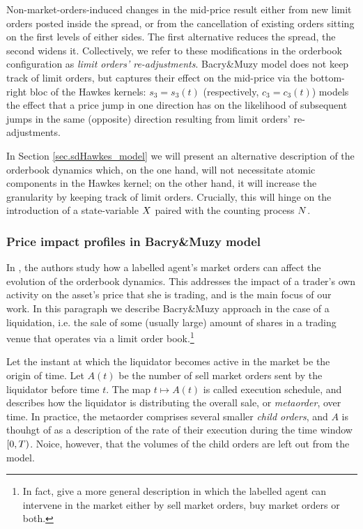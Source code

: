 \documentclass[10pt, article,table]{article}
\begin{document}
Non-market-orders-induced changes in the mid-price result either from new limit orders posted inside the spread, or from the cancellation of existing orders sitting on the first levels of either sides. The first alternative reduces the spread, the second widens it. Collectively, we refer to these modifications in the orderbook configuration as \emph{limit orders' re-adjustments}.   Bacry\&Muzy model does not keep track of limit orders, but captures their effect on the mid-price via the bottom-right bloc of the Hawkes kernels: $s_3=s_3(t)$ (respectively, $c_3=c_3(t)$)  models the effect that a price jump in one direction has on the likelihood of subsequent jumps in the same (opposite) direction resulting from limit orders' re-adjustments.

In Section \ref{sec.sdHawkes_model} we will present an alternative description of the orderbook dynamics which, on the one hand, will not necessitate atomic components in the Hawkes kernel; on the other hand, it will increase the granularity by keeping track of limit orders. Crucially, this will hinge on the introduction of a state-variable $X$ paired with the  counting process $N$. 

\subsubsection{Price impact profiles in Bacry\&Muzy model}\label{sec.BM14_price_impact_profiles}
In \citealp[Section 4]{BM14haw}, the authors study how a labelled agent's market orders can affect the evolution of the orderbook dynamics. This addresses the impact of a trader's own activity on the asset's price that she is trading, and is the main focus of our work. In this paragraph we describe Bacry\&Muzy approach in the case of a liquidation, i.e. the sale of some (usually large) amount of shares in a trading venue that operates via a limit order book.\footnote{In fact, \citealp{BM14haw} give a more general description in which the labelled agent can intervene in the market either by sell market orders, buy market orders or both.}

Let the instant at which the liquidator becomes active in the market be the origin of time. Let $A(t)$ be the number of sell market orders sent by the liquidator before time  $t$. The map $t\mapsto A(t)$ is called execution schedule, and describes how the liquidator is distributing the overall sale, or  \emph{metaorder}, over time.  In practice, the metaorder comprises several smaller \emph{child orders}, and $A$ is thouhgt of as a description of the rate of their execution during the time window $[0,T)$. Noice, however, that the volumes of the child orders are left out from the model. 
\end{document}
